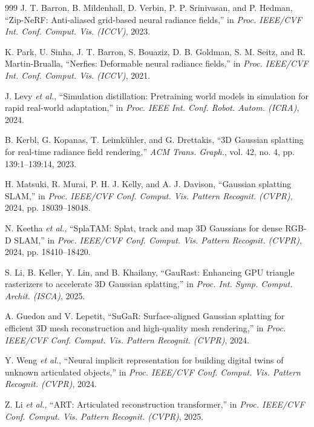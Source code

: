 \documentclass[12pt,a4paper,oneside]{report}
\begin{document}
\begin{thebibliography}{999}
J. T. Barron, B. Mildenhall, D. Verbin, P. P. Srinivasan, and P. Hedman, ``Zip-NeRF: Anti-aliased grid-based neural radiance fields,'' in \textit{Proc. IEEE/CVF Int. Conf. Comput. Vis. (ICCV)}, 2023.

K. Park, U. Sinha, J. T. Barron, S. Bouaziz, D. B. Goldman, S. M. Seitz, and R. Martin-Brualla, ``Nerfies: Deformable neural radiance fields,'' in \textit{Proc. IEEE/CVF Int. Conf. Comput. Vis. (ICCV)}, 2021.

J. Levy \textit{et al.}, ``Simulation distillation: Pretraining world models in simulation for rapid real-world adaptation,'' in \textit{Proc. IEEE Int. Conf. Robot. Autom. (ICRA)}, 2024.

B. Kerbl, G. Kopanas, T. Leimk\"{u}hler, and G. Drettakis, ``{3D} Gaussian splatting for real-time radiance field rendering,'' \textit{ACM Trans. Graph.}, vol. 42, no. 4, pp. 139:1--139:14, 2023.

H. Matsuki, R. Murai, P. H. J. Kelly, and A. J. Davison, ``Gaussian splatting {SLAM},'' in \textit{Proc. IEEE/CVF Conf. Comput. Vis. Pattern Recognit. (CVPR)}, 2024, pp. 18039--18048.

N. Keetha \textit{et al.}, ``{SplaTAM}: Splat, track and map {3D} Gaussians for dense {RGB-D SLAM},'' in \textit{Proc. IEEE/CVF Conf. Comput. Vis. Pattern Recognit. (CVPR)}, 2024, pp. 18410--18420.

S. Li, B. Keller, Y. Lin, and B. Khailany, ``{GauRast}: Enhancing {GPU} triangle rasterizers to accelerate {3D} Gaussian splatting,'' in \textit{Proc. Int. Symp. Comput. Archit. (ISCA)}, 2025.

A. Guedon and V. Lepetit, ``{SuGaR}: Surface-aligned {Gaussian} splatting for efficient {3D} mesh reconstruction and high-quality mesh rendering,'' in \textit{Proc. IEEE/CVF Conf. Comput. Vis. Pattern Recognit. (CVPR)}, 2024.

Y. Weng \textit{et al.}, ``Neural implicit representation for building digital twins of unknown articulated objects,'' in \textit{Proc. IEEE/CVF Conf. Comput. Vis. Pattern Recognit. (CVPR)}, 2024.

Z. Li \textit{et al.}, ``{ART}: Articulated reconstruction transformer,'' in \textit{Proc. IEEE/CVF Conf. Comput. Vis. Pattern Recognit. (CVPR)}, 2025.


\end{thebibliography}
\end{document}
